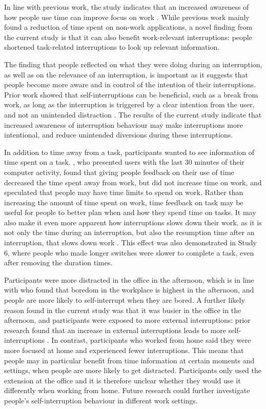 In line with previous work, the study indicates that an increased awareness of how people use time can improve focus on work \citep{Mark2018, Whittaker2016}. While previous work mainly found a reduction of time spent on non-work applications, a novel finding from the current study is that it can also benefit work-relevant interruptions: people shortened task-related interruptions to look up relevant information. 

The finding that people reflected on what they were doing during an interruption, as well as on the relevance of an interruption, is important as it suggests that people become more aware and in control of the intention of their interruptions. Prior work showed that self-interruptions can be beneficial, such as a break from work, as long as the interruption is triggered by a clear intention from the user, and not an unintended distraction \citep{Pang2016}. The results of the current study indicate that increased awareness of interruption behaviour may make interruptions more intentional, and reduce unintended diversions during these interruptions.

In addition to time away from a task, participants wanted to see information of time spent on a task. \citet{Whittaker2016}, who presented users with the last 30 minutes of their computer activity, found that giving people feedback on their use of time decreased the time spent away from work, but did not increase time on work, and speculated that people may have time limits to spend on work. Rather than increasing the amount of time spent on work, time feedback on task may be useful for people to better plan when and how they spend time on tasks. It may also make it even more apparent how interruptions slows down their work, as it is not only the time during an interruption, but also the resumption time after an interruption, that slows down work \citep{Altmann2004}. This effect was also demonstrated in Study 6, where people who made longer switches were slower to complete a task, even after removing the duration times. 

Participants were more distracted in the office in the afternoon, which is in line with \citet{Mark2014} who found that boredom in the workplace is highest in the afternoon, and people are more likely to self-interrupt when they are bored. A further likely reason found in the current study was that it was busier in the office in the afternoon, and participants were exposed to more external interruptions: prior research found that an increase in external interruptions leads to more self-interruptions \citep{Dabbish2011}. In contrast, participants who worked from home said they were more focused at home and experienced fewer interruptions. This means that people may in particular benefit from time information at certain moments and settings, when people are more likely to get distracted. Participants only used the extension at the office and it is therefore unclear whether they would use it differently when working from home. Future research could further investigate people's self-interruption behaviour in different work settings. 

